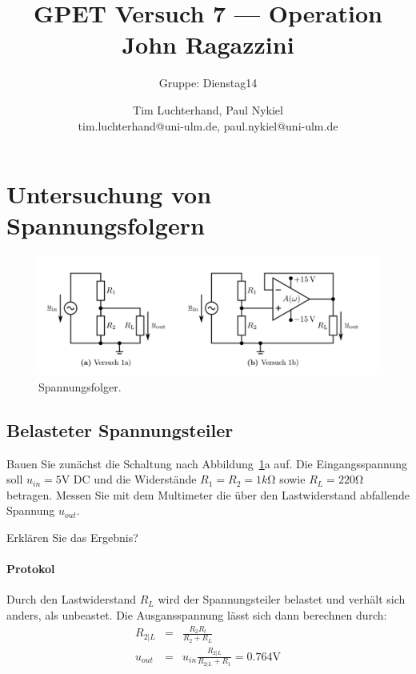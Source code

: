 \documentclass[10pt]{scrreprt}
\author{Tim Luchterhand, Paul Nykiel \protect\\ tim.luchterhand@uni-ulm.de, paul.nykiel@uni-ulm.de}
\title{GPET Versuch 7 --- Operation John Ragazzini}
\subtitle{Gruppe: Dienstag14}
\begin{document}
    \maketitle
    \section{Untersuchung von Spannungsfolgern}
    \begin{center}
        \begin{figure}[H]
            \includegraphics[width=\textwidth]{abb14.png}
            \caption{Spannungsfolger.}
            \label{fig:abb14}
        \end{figure}
    \end{center}
    \subsection{Belasteter Spannungsteiler}
    Bauen Sie zunächst die Schaltung nach Abbildung~\ref{fig:abb14}a auf. Die Eingangsspannung soll
    $u_{in} = 5\si{\volt}$ DC und die Widerstände $R_1 = R_2 = 1\si{k\ohm}$ sowie $R_L = 220\si{\ohm}$ betragen.
    Messen Sie mit dem Multimeter die über den Lastwiderstand abfallende Spannung $u_{out}$.

    \vspace{0.5cm}

    Erklären Sie das Ergebnis?

    \paragraph{Protokol}

    Durch den Lastwiderstand $R_L$ wird der Spannungsteiler belastet und verhält
    sich anders, als unbeastet.
    Die Ausgansspannung lässt sich dann berechnen durch:
    \begin{eqnarray*}
        R_{2 \vert L} &=& \frac{R_2 R_l}{R_2 + R_L} \\
        u_{out} &=& u_{in} \frac{R_{2 \vert L}}{R_{2 \vert L}+R_1} = 0.764\si{\volt}
    \end{eqnarray*}
\end{document}
